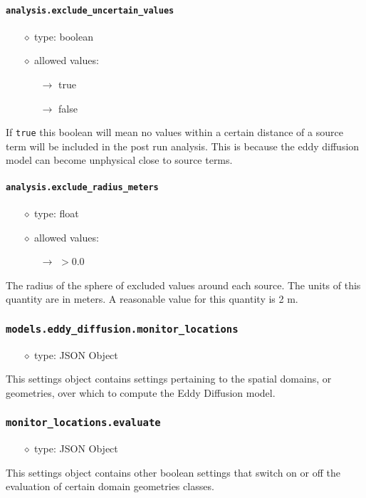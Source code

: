 \documentclass[]{article}
\def\code#1{\texttt{#1}}
\begin{document}
\paragraph{\code{analysis.exclude\_uncertain\_values}}\label{sec:excludevalue}
\begin{itemize}
    \item[$\diamond$] type: boolean
    \item[$\diamond$] allowed values:
    \begin{itemize}
        \item[$\rightarrow$] true
        \item[$\rightarrow$] false
    \end{itemize}
\end{itemize}
If \code{true} this boolean will mean no values within a certain distance of a
source term will be included in the post run analysis. This is because the eddy
diffusion model can become unphysical close to source terms. 

\paragraph{\code{analysis.exclude\_radius\_meters}}\label{sec:excludesphereradius}
\begin{itemize}
    \item[$\diamond$] type: float
    \item[$\diamond$] allowed values:
    \begin{itemize}
        \item[$\rightarrow$] $>0.0$
    \end{itemize}
\end{itemize}
The radius of the sphere of excluded values around each source. The units of
this quantity are in meters. A reasonable value for this quantity is 2 m.

\subsubsection{\code{models.eddy\_diffusion.monitor\_locations}}
\begin{itemize}
    \item[$\diamond$] type: JSON Object 
\end{itemize}
This settings object contains settings pertaining to the spatial domains, or
geometries, over which to compute the Eddy Diffusion model.

\subsubsection{\code{monitor\_locations.evaluate}}
\begin{itemize}
    \item[$\diamond$] type: JSON Object 
\end{itemize}
This settings object contains other boolean settings that switch on or off the
evaluation of certain domain geometries classes.
\end{document}
